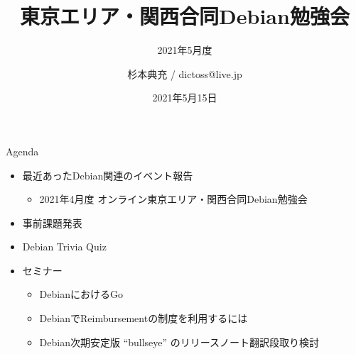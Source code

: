 \title{東京エリア・関西合同Debian勉強会}
\subtitle{2021年5月度} %
\author{杉本典充 / dictoss@live.jp}
\date{2021年5月15日}



\begin{frame}
\titlepage{}
\end{frame}

\begin{frame}{Agenda}
 \begin{minipage}[t]{0.45\hsize}
  \begin{itemize}
  \item 最近あったDebian関連のイベント報告
    \begin{itemize}
    \item 2021年4月度 オンライン東京エリア・関西合同Debian勉強会
    \end{itemize}
  \item 事前課題発表
  \item Debian Trivia Quiz
  \end{itemize}
 \end{minipage}
 \begin{minipage}[t]{0.45\hsize}
   \begin{itemize}
   \item セミナー
     \begin{itemize}
      \item DebianにおけるGo
      \item DebianでReimbursementの制度を利用するには
      \item Debian次期安定版 ``bullseye'' のリリースノート翻訳段取り検討
     \end{itemize}
  \end{itemize}
 \end{minipage}
\end{frame}


